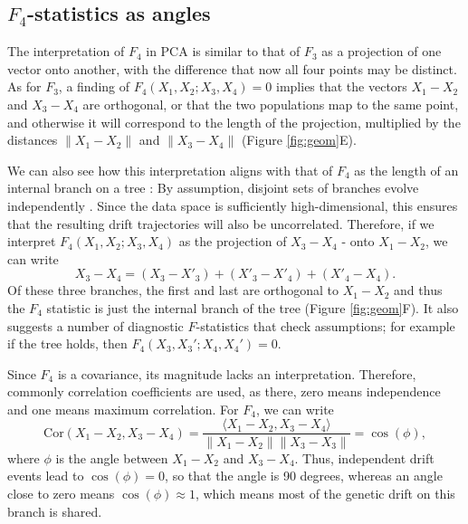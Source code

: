 \documentclass[12pt,fullpage, a4paper]{article}
\newcommand{\norm}[1]{\left\lVert#1\right\rVert}
\begin{document}
\subsection{$F_4$-statistics as angles}
The interpretation of $F_4$ in PCA is similar to that of $F_3$ as a projection of one vector onto another, with the difference that now all four points may be distinct. As for $F_3$, a finding of $F_4(X_1, X_2; X_3, X_4) = 0$ implies that the vectors $X_1 - X_2$ and $X_3 - X_4$ are orthogonal, or that the two populations map to the same point, and otherwise it will correspond to the length of the projection, multiplied by the distances $\norm{X_1 - X_2}$ and $ \norm{X_3 - X_4}$ (Figure \ref{fig:geom}E). 

We can also see how this interpretation aligns with that of $F_4$ as the length of an internal branch on a tree : By assumption, disjoint sets of branches evolve independently \citep{cavalli-sforza1964, felsenstein1973, semple2003}. Since the data space is sufficiently high-dimensional, this ensures that the resulting drift trajectories will also be uncorrelated. Therefore, if we interpret $F_4(X_1, X_2; X_3, X_4)$ as the projection of $X_3 - X_4$ - onto $X_1 - X_2$, we can write  
$$X_3 - X_4  = (X_3 - X'_3) + (X'_3 - X'_4) + (X'_4 - X_4)\text{.}$$ Of these three branches, the first and last are orthogonal to $X_1 - X_2$ and thus the $F_4$ statistic is just the internal branch of the tree (Figure \ref{fig:geom}F). It also suggests a number of diagnostic $F$-statistics that check assumptions; for example if the tree holds, then 
$F_4(X_3, X_3'; X_4, X_4') = 0 $.

Since $F_4$ is a covariance, its magnitude lacks an interpretation. Therefore, commonly correlation coefficients are used, as there, zero means independence and one means maximum correlation. For $F_4$, we can write 
\begin{equation}
\text{Cor}(X_1 - X_2, X_3 - X_4) =  \frac{\langle X_1 - X_2, X_3 - X_4 \rangle}{\norm{X_1-X_2}\norm{X_3-X_3}} = \cos(\phi),\label{eq:angle}
\end{equation}
where $\phi$ is the angle between $X_1 - X_2$ and $X_3 - X_4$. Thus, independent drift events lead to $\cos(\phi) = 0$, so that the angle is 90 degrees, whereas an angle close to zero means $\cos(\phi)\approx 1$, which means most of the genetic drift on this branch is shared.
\end{document}
